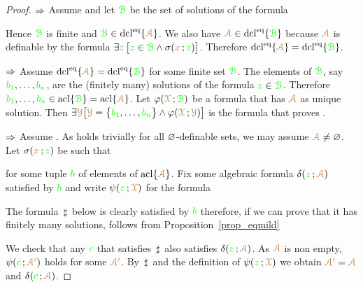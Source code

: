 \documentclass[creche.tex]{subfiles}
\begin{document}
\begin{proof}$\IMP$ Assume  and let ${\gr\B}$ be the set of solutions of the formula


Hence ${\gr\B}$ is finite and ${\gr\B}\in\dcl^\eq\{{\vl\Aa}\}$.
We also have ${\vl\Aa}\in\dcl^\eq\{{\gr\B}\}$ because ${\vl\Aa}$ is definable by the formula $\E{\gr z}\,\big[{\gr z}\in {\gr\B}\wedge \sigma({\mr x}\,;{\gr z})\big]$.
Therefore $\dcl^\eq\{{\vl\Aa}\}=\dcl^\eq\{{\gr\B}\}$.

$\IMP$ Assume $\dcl^\eq\{{\vl\Aa}\}=\dcl^\eq\{{\gr\B}\}$ for some finite set ${\gr\B}$.
The elements of ${\gr\B}$, say ${\gr b_1},\dots,{\gr b_n}$, are the (finitely many) solutions of the formula ${\gr z}\in{\gr\B}$.
Therefore ${\gr b_1},\dots,{\gr b_n}\in\acl\{{\gr\B}\}=\acl\{{\vl\Aa}\}$.
Let $\phi({\vl\X}\,;{\gr\B})$ be a formula that has ${\vl\Aa}$ as unique solution.
Then $\E{\vl\Y} \big[{\vl\Y}=\big\{{\gr b_1},\dots,{\gr b_n}\big\}\wedge \phi({\vl\X}\,;{\vl\Y})\big]$ is the formula that proves .

$\IMP$ Assume .
As  holds trivially for all $\0$-definable sets, we may assume ${\vl\Aa}\neq\0$.
Let $\sigma({\mr x}\,;{\gr z})$ be such that


for some tuple ${\gr b}$ of elements of $\acl\{{\vl\Aa}\}$.
Fix some algebraic formula $\delta({\gr z}\,;{\vl\Aa})$ satisfied by  ${\gr b}$ and write $\psi({\gr z}\,;{\vl\X})$ for the formula


The formula $\,\sharp\,$ below is clearly satisfied by ${\gr b}$ therefore, if we can prove that it has finitely many solutions,  follows from Proposition~\ref{prop_eqmild}


We check that any ${\gr c}$ that satisfies $\,\sharp\,$ also satisfies $\delta({\gr z}\,;{\vl\Aa})$.
As ${\vl\Aa}$ is non empty, $\psi({\gr c}\,;{\vl\Aa'})$ holds for some ${\vl\Aa'}$.
By $\,\sharp\,$ and the definition of $\psi({\gr z}\,;{\vl\X})$ we obtain ${\vl\Aa'}={\vl\Aa}$ and  $\delta({\gr c}\,;{\vl\Aa})$.
\end{proof}
\end{document}
